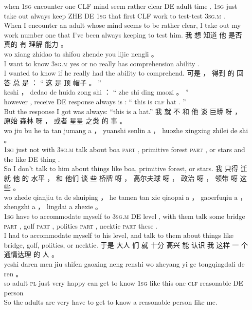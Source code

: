 \documentclass[UTF8]{ctexart}
\begin{document}
\begin{exe}
when \textsc{1sg} encounter one CLF mind seem rather  clear  DE adult time , \textsc{1sg} just {take out} always keep   ZHE DE \textsc{1sg}  that first CLF  work  to   test-test \textsc{3sg.m} .
\\
\trans When I encounter an adult whose mind seems to be rather clear, I take out my work number one that I've been always keeping to test him.
\ex
\glll
我 想 知道 他 是否 真的 有 理解 能力 。
\\
wo xiang zhidao ta shifou zhende you lijie nengli 。
\\
I {want to} know \textsc{3sg.m} {yes or no} really has comprehension ability .
\\
\trans I wanted to know if he really had the ability to comprehend. 
\ex
\glll
可是 ， 得到 的 回答 总 是 ： “ 这 是 顶 帽子 。 ”
\\
keshi ， dedao de huida zong shi ： “ zhe shi ding maozi 。 ”
\\
however , receive DE response always is : `` this is \textsc{clf} hat . ''
\\
\trans But the response I got was always: ``this is a hat.''
\ex
\glll
我 就 不 和 他 谈 巨蟒 呀 ， 原始 森林 呀 ， 或者 星星 之类 的 事 。
\\
wo jiu bu he ta tan jumang a ， yuanshi senlin a ， huozhe xingxing zhilei de shi 。
\\
\textsc{1sg} just not with \textsc{3sg.m} {talk about} boa \textsc{part} , primitive forest \textsc{part} , or stars {and the like} DE thing .
\\
\trans So I don't talk to him about things like boa, primitive forest, or stars. 
\ex
\glll
我 只得 迁就 他 的 水平 ， 和 他们 谈 些 桥牌 呀 ， 高尔夫球 呀 ， 政治 呀 ， 领带 呀 这些 。
\\
wo zhede qianjiu ta de shuiping ， he tamen tan xie qiaopai a ， gaoerfuqiu a ， zhengzhi a ， lingdai a zhexie 。
\\
\textsc{1sg} {have to} {accommodate myself to} \textsc{3sg.m} DE level , with them  talk some bridge \textsc{part} , golf \textsc{part} , politics \textsc{part} , necktie \textsc{part} these .
\\
\trans I had to accommodate myself to his level, and talk to them about things like bridge, golf, politics, or necktie. 
\ex
\glll
于是 大人 们 就 十分 高兴 能 认识 我 这样 一 个 通情达理 的 人 。
\\
yeshi daren men jiu shifen gaoxing neng renshi wo zheyang yi ge tongqingdali de ren 。
\\
so adult \textsc{pl} just very happy can {get to know} \textsc{1sg}  {like this} one \textsc{clf} reasonable DE person
\\
\trans So the adults are very have to get to know a reasonable person like me. 
\end{exe}
\newpage 
\end{document}
